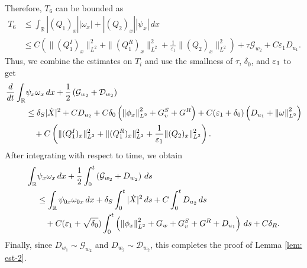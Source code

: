 \documentclass[11pt,reqno]{amsart}
\begin{document}
\begin{appendix}
\begin{align*}
\end{align*}
Therefore, $T_{6}$ can be bounded as
\begin{align*}
T_{6} &\le \int_\mathbb{R} |(Q_1)_x| |\omega_x| + |(Q_2)_x| |\psi_x| \, dx \\
&\le C \left( \|(Q_1^I)_x\|_{L^2}^2 + \|(Q_1^R)_x\|_{L^2}^2 + \frac{1}{\varepsilon_1
} \|(Q_2)_x\|_{L^2}^2 \right) + \tau \mathcal{G}_{w_2} + C \varepsilon_1 D_{u_1}.
\end{align*}
Thus, we combine the estimates on $T_i$ and use the smallness of $\tau$, $\delta_0$, and $\varepsilon_1$ to get
\begin{align*}
\frac{d}{dt}\int_{\mathbb{R}}& \psi_x\omega_x \, dx+\frac{1}{2}\left( \mathcal{G}_{w_2} + \mathcal{D}_{w_2} \right) \\
&\le \delta_S |\dot{X}|^2 + C D_{u_2}+C \delta_0 \left(\left\lVert\phi_x\right\rVert_{L^2}^2+G^S_v + G^R \right)+C(\varepsilon_1+\delta_0) \left(D_{u_1}+\left\lVert\omega\right\rVert_{L^2}^2 \right)\\
&\quad +C \left( \|(Q_1^I)_x\|_{L^2}^2 + \|(Q_1^R)_x\|_{L^2}^2 + \frac{1}{\varepsilon_1
} \|(Q_2)_x\|_{L^2}^2 \right).
\end{align*}
After integrating with respect to time, we obtain
\begin{align*}
\int_{\mathbb{R}} &\psi_x\omega_x \, dx+\frac{1}{2} \int_{0}^t \left( \mathcal{G}_{w_2} + D_{w_2} \right) \, ds 
\\
&\le \int_{\mathbb{R}} \psi_{0x}\omega_{0x} \, dx+ \delta_S \int_0^t |\dot{X}|^2 \, d s + C \int_{0}^{t} D_{u_2} \, ds \\ 
&\quad +C(\varepsilon_1+\sqrt{\delta_0}) \int_0^t \left(\left\lVert\phi_x\right\rVert_{L^2}^2+G_w+G^S_v+G^R+D_{u_1} \right) \, d s+C \delta_R.
\end{align*}
Finally, since $D_{w_1}\sim \mathcal{G}_{w_2}$ and $D_{w_2}\sim \mathcal{D}_{w_2}$, this completes the proof of Lemma \ref{lem: est-2}.

	
\end{appendix}



 
	
\end{document}
